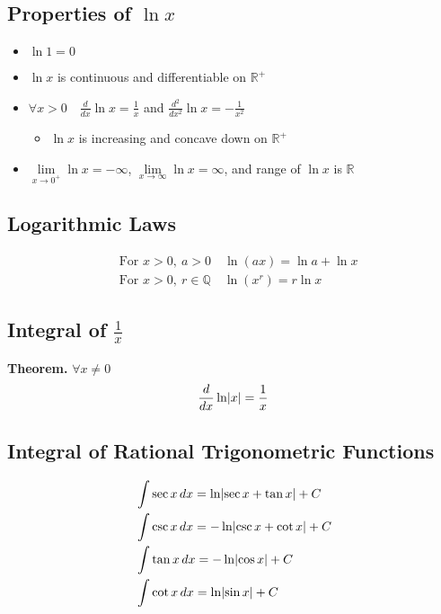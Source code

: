 \documentclass[../ma2002_notes.tex]{subfiles}
\begin{document}
\subsection{Properties of $\ln x$}
\begin{itemize}
	\item\(\ln1=0\)
	\item\(\ln x\) is continuous and differentiable on \(\mathbb{R}^+\)
	\item\(\forall x>0\quad\frac{d}{dx}\ln x=\frac{1}{x}\) and \(\frac{d^2}{dx^2}\ln x=-\frac{1}{x^2}\)
	\begin{itemize}
		\item\(\ln x\) is increasing and concave down on \(\mathbb{R}^+\)
	\end{itemize}
	\item\(\lim\limits_{x\to0^+}\ln x=-\infty\), \(\lim\limits_{x\to\infty}\ln x=\infty\), and range of \(\ln x\) is \(\mathbb{R}\)
\end{itemize}

\subsection{Logarithmic Laws}
\begin{align*}
	&\text{For }x>0,\ a>0\quad\ln(ax)=\ln a+\ln x\\
	&\text{For }x>0,\ r\in\mathbb{Q}\quad\ln(x^r)=r\ln x
\end{align*}

\subsection{Integral of $\frac{1}{x}$}
\textbf{Theorem.} \(\forall x\ne0\)
\[\frac{d}{dx}\ln\lvert x\rvert=\frac{1}{x}\]

\subsection{Integral of Rational Trigonometric Functions}
\begin{align*}
	&\int\sec x\,dx=\ln\lvert\sec x+\tan x\rvert+C\\
	&\int\csc x\,dx=-\ln\lvert\csc x+\cot x\rvert+C\\
	&\int\tan x\,dx=-\ln\lvert\cos x\rvert+C\\
	&\int\cot x\,dx=\ln\lvert\sin x\rvert+C
\end{align*}
\end{document}
